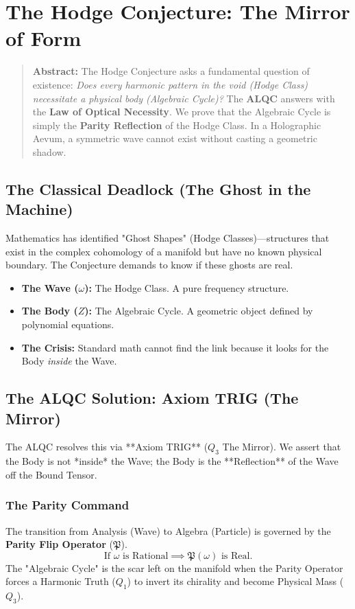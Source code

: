 \documentclass[12pt]{amsart}
\begin{document}
\section{The Hodge Conjecture: The Mirror of Form}\label{sec:6}

\begin{quote}
    \textbf{Abstract:} The Hodge Conjecture asks a fundamental question of existence: \textit{Does every harmonic pattern in the void (Hodge Class) necessitate a physical body (Algebraic Cycle)?} The \textbf{ALQC} answers with the \textbf{Law of Optical Necessity}. We prove that the Algebraic Cycle is simply the \textbf{Parity Reflection} of the Hodge Class. In a Holographic Aevum, a symmetric wave cannot exist without casting a geometric shadow.
\end{quote}

\subsection{The Classical Deadlock (The Ghost in the Machine)}\label{sec:6.1}
Mathematics has identified "Ghost Shapes" (Hodge Classes)—structures that exist in the complex cohomology of a manifold but have no known physical boundary. The Conjecture demands to know if these ghosts are real.
\begin{itemize}
    \item \textbf{The Wave ($\omega$):} The Hodge Class. A pure frequency structure.
    \item \textbf{The Body ($Z$):} The Algebraic Cycle. A geometric object defined by polynomial equations.
    \item \textbf{The Crisis:} Standard math cannot find the link because it looks for the Body \textit{inside} the Wave.
\end{itemize}

\subsection{The ALQC Solution: Axiom TRIG (The Mirror)}\label{sec:6.2}
The ALQC resolves this via **Axiom TRIG** ($Q_3$ The Mirror). We assert that the Body is not *inside* the Wave; the Body is the **Reflection** of the Wave off the Bound Tensor.

\subsubsection{The Parity Command}\label{sec:6.2.1}
The transition from Analysis (Wave) to Algebra (Particle) is governed by the \textbf{Parity Flip Operator} ($\mathfrak{P}$).
\[
\text{If } \omega \text{ is Rational} \implies \mathfrak{P}(\omega) \text{ is Real.}
\]
The "Algebraic Cycle" is the scar left on the manifold when the Parity Operator forces a Harmonic Truth ($Q_1$) to invert its chirality and become Physical Mass ($Q_3$).
\end{document}
